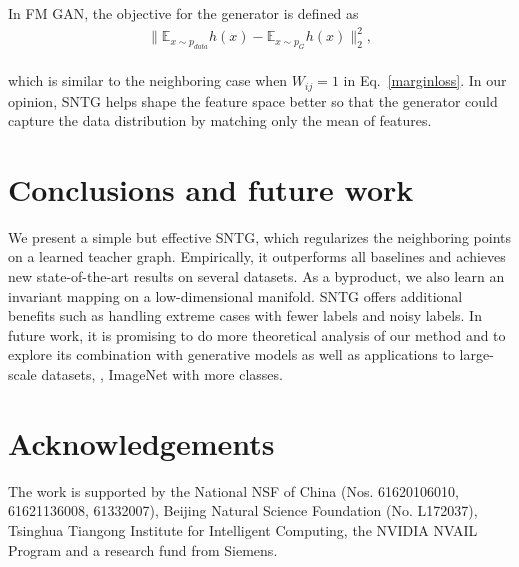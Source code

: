 \documentclass[10pt,twocolumn,letterpaper]{article}
\begin{document}
In FM GAN, the objective for the generator is defined as\\[-.6cm]
\begin{eqnarray}
\|\mathbb{E}_{x\sim p_{data}}h(x) - \mathbb{E}_{x\sim p_G}h(x)\|_2^2,
\end{eqnarray}\\[-.6cm]
which is similar to the neighboring case when
$W_{ij}=1$ in Eq.~\eqref{marginloss}.
In our opinion, SNTG helps shape the feature space better so that the generator could capture the data distribution by matching only the mean of features.

\section{Conclusions and future work}
We present a simple but effective SNTG, which
regularizes the neighboring points on a learned teacher graph. Empirically, it outperforms all baselines and achieves new state-of-the-art results on several datasets. As a byproduct, we also learn an invariant mapping on a low-dimensional manifold. SNTG offers additional benefits such as handling extreme cases with fewer labels and noisy labels.
In future work, it is promising to do more theoretical analysis of our method and to explore its combination with generative models as well as applications to large-scale datasets, \eg, ImageNet with more classes.

\vspace{-1ex}
\section*{Acknowledgements}
\vspace{-1ex}
\small{
The work is supported by the National NSF of China (Nos. 61620106010, 61621136008, 61332007), Beijing Natural Science Foundation (No. L172037), Tsinghua Tiangong Institute for Intelligent Computing, the NVIDIA NVAIL Program and a research fund from Siemens.
}
\end{document}

